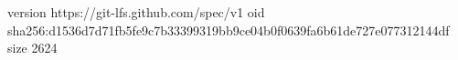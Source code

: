 version https://git-lfs.github.com/spec/v1
oid sha256:d1536d7d71fb5fe9c7b33399319bb9ce04b0f0639fa6b61de727e077312144df
size 2624
